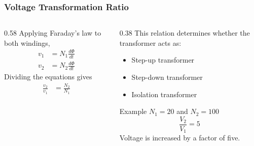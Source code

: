 \begin{frame}
    \frametitle{Voltage Transformation Ratio}
    \begin{columns}
        \begin{column}{0.58\textwidth}
            Applying Faraday's law to both windings,
            \begin{align}
                v_1 &= N_1\frac{d\Phi}{dt}
            \end{align}
            \begin{align}
                v_2 &= N_2\frac{d\Phi}{dt}
            \end{align}
            Dividing the equations gives
            \begin{align}
                \frac{v_2}{v_1} &= \frac{N_2}{N_1}
            \end{align}
        \end{column}
        \begin{column}{0.38\textwidth}
            This relation determines whether the transformer acts as:
            \begin{itemize}
                \item Step-up transformer
                \item Step-down transformer
                \item Isolation transformer
            \end{itemize}
            \begin{block}{Example}
                $N_1=20$ and $N_2=100$
                \begin{equation}
                    \frac{V_2}{V_1}=5
                \end{equation}
                Voltage is increased by a factor of five.
            \end{block}
        \end{column}
    \end{columns}
\end{frame}


